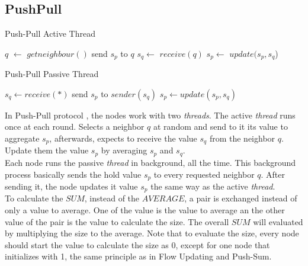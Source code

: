 \subsection{PushPull}
\begin{algorithm}
\caption{Push-Pull Active Thread}
\begin{algorithmic}
\STATE $q$ $\leftarrow$ $getneighbour()$
\STATE send $s_p$ to $q$
\STATE $s_q \leftarrow$ $receive(q)$
\STATE $s_p \leftarrow$ $update(s_p,s_q$)
\end{algorithmic}
\end{algorithm}
\begin{algorithm}
\caption{Push-Pull Passive Thread}
\begin{algorithmic}
\STATE $s_q \leftarrow receive(*)$
\STATE send $s_p$ to $sender(s_q)$
\STATE $s_p \leftarrow update(s_p,s_q)$
\end{algorithmic}
\end{algorithm}
In Push-Pull protocol \cite{jelasity2005gossip}, the nodes work with two \textit{threads}. The active \textit{thread} runs once at each round. Selects a neighbor $q$ at random and send to it its value to aggregate $s_p$, afterwards, expects to receive the value $s_q$ from the neighbor $q$. Update them the value $s_p$ by averaging $s_p$ and $s_q$.\\
Each node runs the passive \textit{thread} in background, all the time. This background process basically sends the hold value $s_p$ to every requested neighbor $q$. After sending it, the node updates it value $s_p$ the same way as the active \textit{thread}.\\
To calculate the $SUM$, instead of the $AVERAGE$, a pair is exchanged instead of only a value to average. One of the value is the value to average an the other value of the pair is the value to calculate the size. The overall $SUM$ will evaluated by multiplying the size to the average. Note that to evaluate the size, every node should start the value to calculate the size as 0, except for one node that initializes with 1, the same principle as in Flow Updating and Push-Sum.
